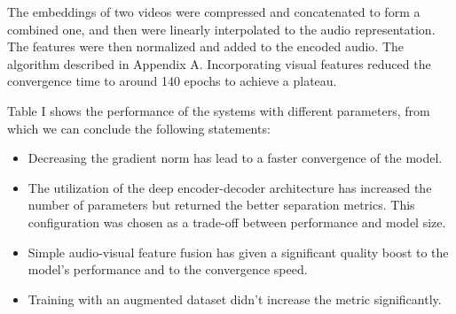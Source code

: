 \documentclass[10pt,conference,compsocconf]{IEEEtran}
\begin{document}
The embeddings of two videos were compressed and concatenated to form a combined one, and then were linearly interpolated to the audio representation. The features were then normalized and added to the encoded audio. The algorithm described in Appendix A. Incorporating visual features reduced the convergence time to around 140 epochs to achieve a plateau.

Table I shows the performance of the systems with different parameters, from which we can conclude the following statements:

\begin{itemize}
	\item Decreasing the gradient norm has lead to a faster convergence of the model.
	\item The utilization of the deep encoder-decoder architecture has increased the number of parameters but returned the better separation metrics. This configuration was chosen as a trade-off between performance and model size.
	\item Simple audio-visual feature fusion has given a significant quality boost to the model's performance and to the convergence speed.
	\item Training with an augmented dataset didn't increase the metric significantly.
\end{itemize}
\begin{table}[h!]
\centering
\caption{The effect of different configurations in Conv-TasNet.}
\end{table}
\end{document}
